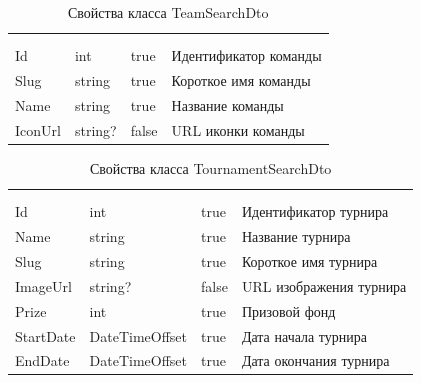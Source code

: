 \begin{xltabular}{\textwidth}{|X|X|X|X|}
	\caption{Свойства класса TeamSearchDto}\label{table:TeamSearchDto}\\ \hline
	 &  &  &  \\ \hline
	 &  &  &  \\ \hline
	\endfirsthead
	 \hline
	 &  &  &  \\ \hline
	\endhead
	Id & int & true & Идентификатор команды \\ \hline
	Slug & string & true & Короткое имя команды \\ \hline
	Name & string & true & Название команды \\ \hline
	IconUrl & string? & false & URL иконки команды \\ \hline
\end{xltabular}

\begin{xltabular}{\textwidth}{|X|X|X|X|}
	\caption{Свойства класса TournamentSearchDto}\label{table:TournamentSearchDto}\\ \hline
	 &  &  &  \\ \hline
	 &  &  &  \\ \hline
	\endfirsthead
	 \hline
	 &  &  &  \\ \hline
	\endhead
	Id & int & true & Идентификатор турнира \\ \hline
	Name & string & true & Название турнира \\ \hline
	Slug & string & true & Короткое имя турнира \\ \hline
	ImageUrl & string? & false & URL изображения турнира \\ \hline
	Prize & int & true & Призовой фонд \\ \hline
	StartDate & DateTimeOffset & true & Дата начала турнира \\ \hline
	EndDate & DateTimeOffset & true & Дата окончания турнира \\ \hline
\end{xltabular}

